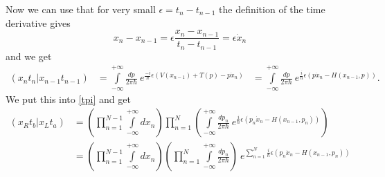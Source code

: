 Now we can use that for very small $\epsilon = t_n - t_{n-1}$ the definition of the time derivative gives
\begin{equation}\label{deriv}
  x_{n} - x_{n-1} = \epsilon \frac{x_{n} -x_{n-1}}{t_n - t_{n-1}} =  \epsilon \dot{x}_n
\end{equation}
and we get
\begin{align}
   (x_n t_n | x_{n-1} t_{n-1})  &=  \int\limits_{-\infty}^{+\infty} \frac{dp}{2 \pi \hbar}  \ e^{\frac{-i}{\hbar} \epsilon ( V(x_{n-1}) + T(p) - p \dot{x}_n)}
                                &=  \int\limits_{-\infty}^{+\infty} \frac{dp}{2 \pi \hbar}  \ e^{\frac{i}{\hbar} \epsilon (p \dot{x}_n - H(x_{n-1},p))}.
\end{align}
We put this into \ref{tpi} and get 
\begin{align}
  (x_R t_b | x_L t_a) &=  (\prod_{n=1}^{N-1} \int\limits_{-\infty}^{+\infty} dx_{n})\prod_{n=1}^{N} (\int\limits_{-\infty}^{+\infty} \frac{dp_n}{2 \pi \hbar}  \ e^{\frac{i}{\hbar} \epsilon (p_n \dot{x}_n - H(x_{n-1},p_n))})  \\
                      &=  (\prod_{n=1}^{N-1} \int\limits_{-\infty}^{+\infty} dx_{n})(\prod_{n=1}^{N} \int\limits_{-\infty}^{+\infty}  \frac{dp_n}{2 \pi \hbar}) \ e^{\sum_{n=1}^{N}\frac{i}{\hbar} \epsilon (p_n \dot{x}_n - H(x_{n-1},p_n))}
\end{align}
